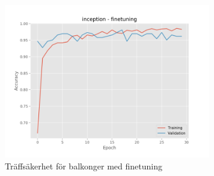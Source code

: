 \documentclass[]{kththesis}
\begin{document}
\begin{figure}[h]
    \includegraphics[width=9cm]{b_a_inception_fine}
    \caption{Träffsäkerhet för balkonger med finetuning}
    \label{fig:b_a_2}
  \end{figure}
\end{document}
